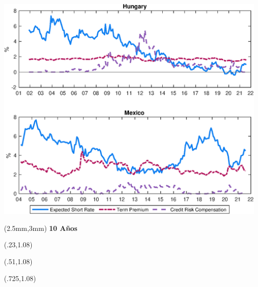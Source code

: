 \documentclass[12pt, aspectratio=169, xcolor=dvipsnames]{beamer}
\begin{document}
\begin{frame}[label=YldDcmp2]
\begin{center}							%
\includegraphics[trim={0cm 0cm 0cm 0cm},clip,height=0.95\textheight,width=\linewidth]{../Figures/Estimation/HUF_MXN_dcmp.eps} \\
\end{center}
\begin{textblock*}{15cm}(2.5mm,3mm)
	\textbf{10 Años}
\end{textblock*}
\begin{textblock*}{3cm}(.23\textwidth,1.08\textheight)
	\hyperlink{YldDcmp10}{}
\end{textblock*}
\begin{textblock*}{3cm}(.51\textwidth,1.08\textheight)
\hyperlink{tpCI}{}
\end{textblock*}
\begin{textblock*}{5cm}(.725\textwidth,1.08\textheight)
\hyperlink{crcCI}{}
\end{textblock*}
\end{frame}
\end{document}
